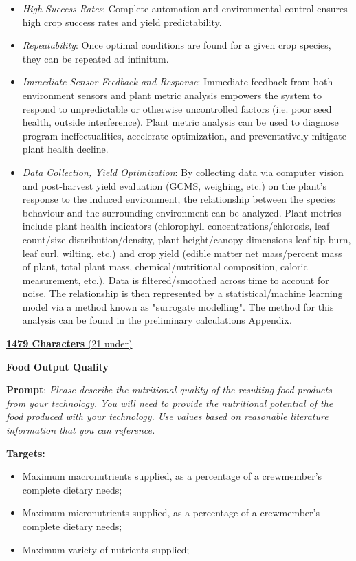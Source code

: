 \documentclass{report}
\begin{document}
\begin{itemize}
    \item \textit{High Success Rates}: Complete automation and environmental control ensures high crop success rates and yield predictability.
    \item \textit{Repeatability}: Once optimal conditions are found for a given crop species, they can be repeated ad infinitum.
    \item \textit{Immediate Sensor Feedback and Response}: Immediate feedback from both environment sensors and plant metric analysis empowers the system to respond to unpredictable or otherwise uncontrolled factors (i.e. poor seed health, outside interference). Plant metric analysis can be used to diagnose program ineffectualities, accelerate optimization, and preventatively mitigate plant health decline.
    \item \textit{Data Collection, Yield Optimization}: By collecting data via computer vision and post-harvest yield evaluation (GCMS, weighing, etc.) on the plant's response to the induced environment, the relationship between the species behaviour and the surrounding environment can be analyzed. Plant metrics include plant health indicators (chlorophyll concentrations/chlorosis, leaf count/size distribution/density, plant height/canopy dimensions leaf tip burn, leaf curl, wilting, etc.) and crop yield (edible matter net mass/percent mass of plant, total plant mass, chemical/nutritional composition, caloric measurement, etc.). Data is filtered/smoothed across time to account for noise. The relationship is then represented by a statistical/machine learning model via a method known as "surrogate modelling". The method for this analysis can be found in the preliminary calculations Appendix.
    
\end{itemize}

\uline{\textbf{1479 Characters} (21 under)}

\vspace{0.5cm}

\textbf{Food Output Quality}
\label{sec:resource-outputquality}

\textbf{Prompt}: \textit{Please describe  the nutritional quality of the resulting food products from your technology. You will need to provide the nutritional potential of the food produced with your technology. Use values based on reasonable literature information that you can reference.}

\textbf{Targets:}
\begin{itemize}
    \item Maximum macronutrients supplied, as a percentage of a crewmember’s complete dietary needs;
    \item Maximum micronutrients supplied, as a percentage of a crewmember’s complete dietary needs;
    \item Maximum variety of nutrients supplied;
\end{itemize}
\end{document}
